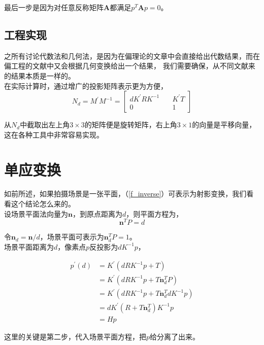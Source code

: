 			最后一步是因为对任意反称矩阵$\mathbf{A}$都满足$ p^T \mathbf{A} p = 0 $。

	\subsection*{工程实现}
		之所有讨论代数法和几何法，是因为在偏理论的文章中会直接给出代数结果，而在偏工程的文献中又会根据几何变换给出一个结果，
		我们需要确保，从不同文献来的结果本质是一样的。\\

		在实际计算时，通过增广的投影矩阵表示更为方便，
		\begin{equation}
			N_d= M^{\prime}M^{-1} = \begin{bmatrix}
				dK^\prime R K^{-1} \quad& K^\prime T\\
				0\quad& 1\quad
			\end{bmatrix}\label{extend_f}		
		\end{equation}

		从$N_d$中截取出左上角$3\times 3$的矩阵便是旋转矩阵，右上角$3\times 1$的向量是平移向量，这在各种工具中非常容易实现。

\section{单应变换}

	如前所述，如果拍摄场景是一张平面，（\ref{f_inverse}）可表示为射影变换，我们看看这个结论怎么来的。\\

	设场景平面法向量为$\mathbf{n}$，到原点距离为$d$，则平面方程为，
	$$
		\mathbf{n}^T P = d
	$$

	令$\mathbf{n}_d = \mathbf{n}/d$，场景平面可表示为$\mathbf{n}_d^T P = 1$。\\

	场景平面距离为$d$，像素点$p$反投影为$dK^{-1}p$，

	\begin{align*}
		p^{\prime}(d) &= K^{\prime}\left(dRK^{-1}p + T\right)\\
		&= K^{\prime}\left(dRK^{-1}p + T\mathbf{n}_d^T P\right)\\
		&= K^{\prime}\left(dRK^{-1}p + T\mathbf{n}_d^TdK^{-1}p\right)\\
		&= dK^{\prime}\left(R + T\mathbf{n}_d^T\right)K^{-1}p\\
		&= Hp
	\end{align*}

	这里的关键是第二步，代入场景平面方程，把$p$给分离了出来。\\

